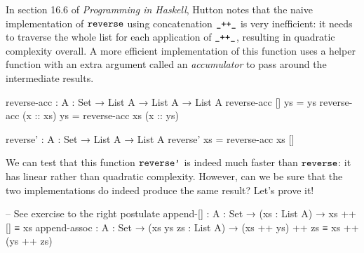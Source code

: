 \documentclass[a4paper,UKenglish]{tufte-handout}
\theoremstyle{definition}
\newcommand\fun[1]{{\AgdaFunction{#1}}}
\begin{document}
In section 16.6 of \emph{Programming in Haskell}, Hutton notes that
the naive implementation of $\fun{reverse}$ using concatenation
$\fun{\_++\_}$ is very inefficient: it needs to traverse the whole
list for each application of $\fun{\_++\_}$, resulting in quadratic
complexity overall. A more efficient implementation of this function
uses a helper function with an extra argument called an
\emph{accumulator} to pass around the intermediate results.
\begin{AgdaAlign}
\begin{AgdaSuppressSpace}
\begin{code}[number]
reverse-acc : {A : Set} → List A → List A → List A
reverse-acc []        ys = ys
reverse-acc (x :: xs) ys = reverse-acc xs (x :: ys)

\end{code}
\begin{code}[number]
reverse' : {A : Set} → List A → List A
reverse' xs = reverse-acc xs []
\end{code}
\end{AgdaSuppressSpace}
\end{AgdaAlign}
We can test that this function $\fun{reverse'}$ is indeed much faster
than $\fun{reverse}$: it has linear rather than quadratic complexity.
However, can we be sure that the two implementations do indeed produce
the same result? Let's prove it!
\begin{code}[hide]
-- See exercise to the right
postulate
  append-[] : {A : Set} → (xs : List A) → xs ++ [] ≡ xs
  append-assoc : {A : Set} → (xs ys zs : List A)
               → (xs ++ ys) ++ zs ≡ xs ++ (ys ++ zs)
\end{code}
\end{document}

